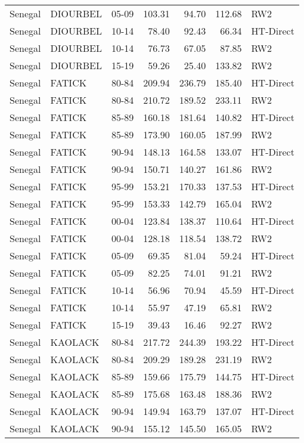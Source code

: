 \begin{longtable}{lllrrrl}
  Senegal & DIOURBEL & 05-09 & 103.31 & 94.70 & 112.68 & RW2 \\ 
  Senegal & DIOURBEL & 10-14 & 78.40 & 92.43 & 66.34 & HT-Direct \\ 
  Senegal & DIOURBEL & 10-14 & 76.73 & 67.05 & 87.85 & RW2 \\ 
  Senegal & DIOURBEL & 15-19 & 59.26 & 25.40 & 133.82 & RW2 \\ 
  Senegal & FATICK & 80-84 & 209.94 & 236.79 & 185.40 & HT-Direct \\ 
  Senegal & FATICK & 80-84 & 210.72 & 189.52 & 233.11 & RW2 \\ 
  Senegal & FATICK & 85-89 & 160.18 & 181.64 & 140.82 & HT-Direct \\ 
  Senegal & FATICK & 85-89 & 173.90 & 160.05 & 187.99 & RW2 \\ 
  Senegal & FATICK & 90-94 & 148.13 & 164.58 & 133.07 & HT-Direct \\ 
  Senegal & FATICK & 90-94 & 150.71 & 140.27 & 161.86 & RW2 \\ 
  Senegal & FATICK & 95-99 & 153.21 & 170.33 & 137.53 & HT-Direct \\ 
  Senegal & FATICK & 95-99 & 153.33 & 142.79 & 165.04 & RW2 \\ 
  Senegal & FATICK & 00-04 & 123.84 & 138.37 & 110.64 & HT-Direct \\ 
  Senegal & FATICK & 00-04 & 128.18 & 118.54 & 138.72 & RW2 \\ 
  Senegal & FATICK & 05-09 & 69.35 & 81.04 & 59.24 & HT-Direct \\ 
  Senegal & FATICK & 05-09 & 82.25 & 74.01 & 91.21 & RW2 \\ 
  Senegal & FATICK & 10-14 & 56.96 & 70.94 & 45.59 & HT-Direct \\ 
  Senegal & FATICK & 10-14 & 55.97 & 47.19 & 65.81 & RW2 \\ 
  Senegal & FATICK & 15-19 & 39.43 & 16.46 & 92.27 & RW2 \\ 
  Senegal & KAOLACK & 80-84 & 217.72 & 244.39 & 193.22 & HT-Direct \\ 
  Senegal & KAOLACK & 80-84 & 209.29 & 189.28 & 231.19 & RW2 \\ 
  Senegal & KAOLACK & 85-89 & 159.66 & 175.79 & 144.75 & HT-Direct \\ 
  Senegal & KAOLACK & 85-89 & 175.68 & 163.48 & 188.36 & RW2 \\ 
  Senegal & KAOLACK & 90-94 & 149.94 & 163.79 & 137.07 & HT-Direct \\ 
  Senegal & KAOLACK & 90-94 & 155.12 & 145.50 & 165.05 & RW2 \\ 

\end{longtable}
